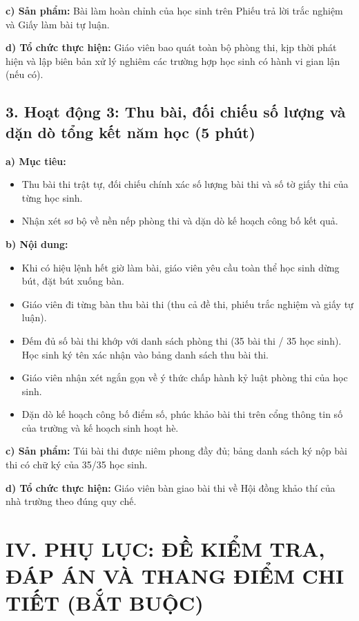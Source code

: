 \documentclass[12pt, a4paper]{article}
\begin{document}
\noindent \textbf{c) Sản phẩm:}
Bài làm hoàn chỉnh của học sinh trên Phiếu trả lời trắc nghiệm và Giấy làm bài tự luận.

\noindent \textbf{d) Tổ chức thực hiện:}
Giáo viên bao quát toàn bộ phòng thi, kịp thời phát hiện và lập biên bản xử lý nghiêm các trường hợp học sinh có hành vi gian lận (nếu có).

\subsection*{3. Hoạt động 3: Thu bài, đối chiếu số lượng và dặn dò tổng kết năm học (5 phút)}

\noindent \textbf{a) Mục tiêu:}
\begin{itemize}[leftmargin=0.6cm]
    \item Thu bài thi trật tự, đối chiếu chính xác số lượng bài thi và số tờ giấy thi của từng học sinh.
    \item Nhận xét sơ bộ về nền nếp phòng thi và dặn dò kế hoạch công bố kết quả.
\end{itemize}

\noindent \textbf{b) Nội dung:}
\begin{itemize}[leftmargin=0.6cm]
    \item Khi có hiệu lệnh hết giờ làm bài, giáo viên yêu cầu toàn thể học sinh dừng bút, đặt bút xuống bàn.
    \item Giáo viên đi từng bàn thu bài thi (thu cả đề thi, phiếu trắc nghiệm và giấy tự luận).
    \item Đếm đủ số bài thi khớp với danh sách phòng thi (35 bài thi / 35 học sinh). Học sinh ký tên xác nhận vào bảng danh sách thu bài thi.
    \item Giáo viên nhận xét ngắn gọn về ý thức chấp hành kỷ luật phòng thi của học sinh.
    \item Dặn dò kế hoạch công bố điểm số, phúc khảo bài thi trên cổng thông tin số của trường và kế hoạch sinh hoạt hè.
\end{itemize}

\noindent \textbf{c) Sản phẩm:}
Túi bài thi được niêm phong đầy đủ; bảng danh sách ký nộp bài thi có chữ ký của 35/35 học sinh.

\noindent \textbf{d) Tổ chức thực hiện:}
Giáo viên bàn giao bài thi về Hội đồng khảo thí của nhà trường theo đúng quy chế.

\vspace{10pt}

\section*{IV. PHỤ LỤC: ĐỀ KIỂM TRA, ĐÁP ÁN VÀ THANG ĐIỂM CHI TIẾT (BẮT BUỘC)}
\end{document}
